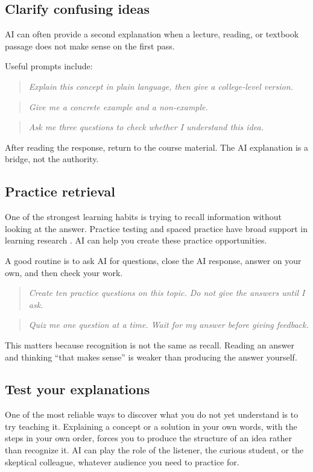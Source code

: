 \documentclass{SIAMbook2023}
\newcommand{\studentprompt}[1]{\begin{quote}\small\itshape #1\end{quote}}
\begin{document}
\subsection{Clarify confusing ideas}
\label{subsec:clarify}

AI can often provide a second explanation when a lecture, reading, or textbook passage does not make sense on the first pass.

Useful prompts include:

\studentprompt{Explain this concept in plain language, then give a college-level version.}

\studentprompt{Give me a concrete example and a non-example.}

\studentprompt{Ask me three questions to check whether I understand this idea.}

After reading the response, return to the course material. The AI explanation is a bridge, not the authority.

\subsection{Practice retrieval}
\label{subsec:retrieval}%

One of the strongest learning habits is trying to recall information without looking at the answer. Practice testing and spaced practice have broad support in learning research \citep{dunlosky2013improving}. AI can help you create these practice opportunities.

A good routine is to ask AI for questions, close the AI response, answer on your own, and then check your work.

\studentprompt{Create ten practice questions on this topic. Do not give the answers until I ask.}

\studentprompt{Quiz me one question at a time. Wait for my answer before giving feedback.}

This matters because recognition is not the same as recall. Reading an answer and thinking ``that makes sense'' is weaker than producing the answer yourself.

\subsection{Test your explanations}
\label{subsec:teach-ai}

One of the most reliable ways to discover what you do not yet understand is to try teaching it. Explaining a concept or a solution in your own words, with the steps in your own order, forces you to produce the structure of an idea rather than recognize it. AI can play the role of the listener, the curious student, or the skeptical colleague, whatever audience you need to practice for.
\end{document}

